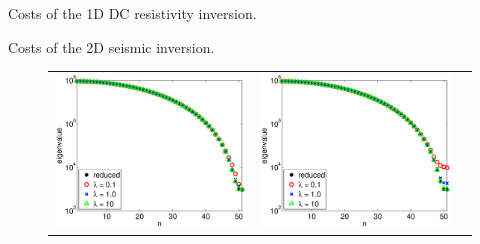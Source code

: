 \documentclass{iopart}
\begin{document}
\begin{table}
\centering

\caption{Costs of the 1D DC resistivity inversion.}
\label{table:1D_exp1}
\end{table}

\begin{table}
\centering

\caption{Costs of the 2D seismic inversion.}
\label{table:2D_exp1}
\end{table}

\clearpage

\begin{figure}
\centering
\begin{tabular}{ccc}
\includegraphics[scale=.2]{./figs/example2_a}&
\includegraphics[scale=.2]{./figs/example2_b}&

\end{tabular}
\end{figure}
\end{document}
